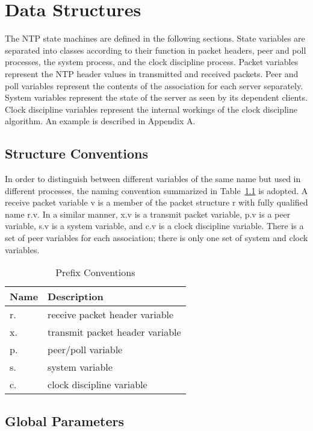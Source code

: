 \chapter{Data Structures}
\label{section-7}

The NTP state machines are defined in the following sections. State
variables are separated into classes according to their function in
packet headers, peer and poll processes, the system process, and the
clock discipline process. Packet variables represent the NTP header
values in transmitted and received packets. Peer and poll variables
represent the contents of the association for each server separately.
System variables represent the state of the server as seen by its
dependent clients. Clock discipline variables represent the internal
workings of the clock discipline algorithm. An example is described
in Appendix A.

\section{Structure Conventions}
\label{section-7-1}

In order to distinguish between different variables of the same name
but used in different processes, the naming convention summarized in
Table~\ref{prefix_conventions} is adopted. A receive packet variable v is a member of the
packet structure r with fully qualified name r.v. In a similar
manner, x.v is a transmit packet variable, p.v is a peer variable,
s.v is a system variable, and c.v is a clock discipline variable.
There is a set of peer variables for each association; there is only
one set of system and clock variables.

\begin{table}[htb]
  \center
  \begin{tabular}{| l | l |}
    \hline
    Name & Description \\
    \hline
    \hline
    r. & receive packet header variable \\
    x. & transmit packet header variable \\
    p. & peer/poll variable \\
    s. & system variable \\
    c. & clock discipline variable \\
    \hline
  \end{tabular}
  \caption{Prefix Conventions}
  \label{prefix_conventions}
\end{table}

\section{Global Parameters}
\label{section-7-2}

